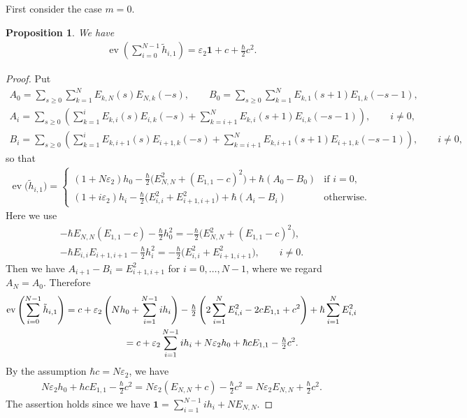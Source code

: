 \documentclass[10pt,a4paper]{amsart}
\newtheorem{prop}[thm]{Proposition}
\theoremstyle{definition}
\numberwithin{equation}{section}
\DeclareMathOperator{\ev}{ev}
\newcommand{\ve}{\varepsilon}
\newcommand{\bfid}{\mathbf{1}}
\begin{document}
First consider the case $m=0$.
\begin{prop}\label{prop:zero-mode} We have
\begin{gather*} \ev \left( \sum_{i=0}^{N-1} \tilde{h}_{i,1} \right)= \ve_2 \bfid + c + \tfrac{\hbar}{2} c^2.
\end{gather*}
\end{prop}
\begin{proof}
Put
\begin{gather*}
A_0 = \sum_{s \geq 0} \sum_{k=1}^N E_{k,N}(s)E_{N,k}(-s),\qquad
B_0 = \sum_{s \geq 0} \sum_{k=1}^N E_{k,1}(s+1)E_{1,k}(-s-1),\\
A_i = \sum_{s \geq 0} \left( \sum_{k=1}^i E_{k,i}(s)E_{i,k}(-s) + \sum_{k=i+1}^N E_{k,i}(s+1)E_{i,k}(-s-1) \right), \qquad i \neq 0,\\
B_i = \sum_{s \geq 0} \left( \sum_{k=1}^i E_{k,i+1}(s)E_{i+1,k}(-s) + \sum_{k=i+1}^N E_{k,i+1}(s+1)E_{i+1,k}(-s-1) \right), \qquad i \neq 0,
\end{gather*}
so that
\begin{gather*}
\ev\big(\tilde{h}_{i,1}\big) = \begin{cases}
(1+ N \varepsilon_2) h_{0} - \tfrac{\hbar}{2} \big(E_{N,N}^2 + (E_{1,1}-c)^2\big) + \hbar(A_0-B_0)& \text{if $i=0$},\\
(1+ i \varepsilon_2) h_{i} - \tfrac{\hbar}{2} \big(E_{i,i}^2 + E_{i+1,i+1}^2\big) + \hbar(A_i-B_i)& \text{otherwise}.
\end{cases}
\end{gather*}
Here we use
\begin{gather*}
-\hbar E_{N,N}(E_{1,1}-c) - \tfrac{\hbar}{2} h_0^2 = - \tfrac{\hbar}{2} \big(E_{N,N}^2 + (E_{1,1}-c)^2\big),\\
-\hbar E_{i,i} E_{i+1,i+1} - \tfrac{\hbar}{2} h_i^2 = - \tfrac{\hbar}{2} \big(E_{i,i}^2 + E_{i+1,i+1}^2\big), \qquad i \neq 0.
\end{gather*}
Then we have $A_{i+1}-B_{i}=E_{i+1,i+1}^2$ for $i=0,\ldots,N-1$, where we regard $A_N=A_0$.
Therefore
\begin{gather*}
\ev \left( \sum_{i=0}^{N-1} \tilde{h}_{i,1} \right)= c + \ve_2 \left(N h_0 + \sum_{i=1}^{N-1} i h_i\right) -\tfrac{\hbar}{2}\left( 2\sum_{i=1}^N E_{i,i}^2 - 2cE_{1,1} + c^2\right) + \hbar \sum_{i=1}^N E_{i,i}^2 \\
\hphantom{\ev \left( \sum_{i=0}^{N-1} \tilde{h}_{i,1} \right)}{} = c + \ve_2 \sum_{i=1}^{N-1} i h_i + N \ve_2 h_0 + \hbar c E_{1,1} - \tfrac{\hbar}{2}c^2.
\end{gather*}
By the assumption $\hbar c = N\ve_2$, we have
\begin{gather*}
N \ve_2 h_0 + \hbar c E_{1,1} - \tfrac{\hbar}{2}c^2 = N \ve_2 (E_{N,N} + c) - \tfrac{\hbar}{2}c^2 = N \ve_2 E_{N,N} + \tfrac{\hbar}{2}c^2.
\end{gather*}
The assertion holds since we have $\bfid = \sum\limits_{i=1}^{N-1} i h_i + NE_{N,N}$.
\end{proof}
\end{document}
